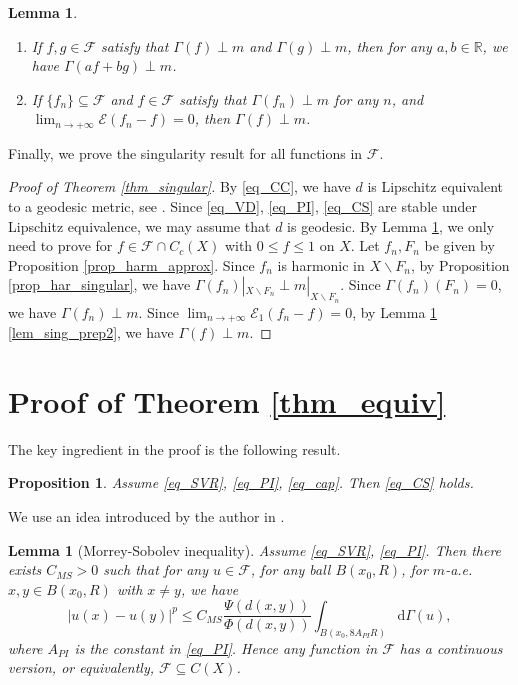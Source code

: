 \documentclass[11pt,a4paper]{article}
\numberwithin{equation}{section}
\theoremstyle{plain}
\newtheorem{proposition}[theorem]{Proposition}
\newtheorem{lemma}[theorem]{Lemma}
\theoremstyle{definition}
\begin{document}
\begin{lemma}\label{lem_sing_prep}
\hspace{0em}
\begin{enumerate}[label=(\arabic*),ref=(\arabic*)]
\item\label{lem_sing_prep1} If $f, g\in\mathcal{F}$ satisfy that $\Gamma(f)\perp m$ and $\Gamma(g)\perp m$, then for any $a,b\in\mathbb{R}$, we have $\Gamma(af+bg)\perp m$.
\item\label{lem_sing_prep2} If $\{f_n\}\subseteq\mathcal{F}$ and $f\in\mathcal{F}$ satisfy that $\Gamma(f_n)\perp m$ for any $n$, and $\lim_{n\to+\infty}\mathcal{E}(f_n-f)=0$, then $\Gamma(f)\perp m$.
\end{enumerate} 
\end{lemma}

Finally, we prove the singularity result for all functions in $\mathcal{F}$.

\begin{proof}[Proof of Theorem \ref{thm_singular}]
By \ref{eq_CC}, we have $d$ is Lipschitz equivalent to a geodesic metric, see \cite[PROPOSITION A.1]{KM20}. Since \ref{eq_VD}, \ref{eq_PI}, \ref{eq_CS} are stable under Lipschitz equivalence, we may assume that $d$ is geodesic. By Lemma \ref{lem_sing_prep}, we only need to prove for $f\in\mathcal{F}\cap C_c(X)$ with $0\le f\le1$ on $X$. Let $f_n, F_n$ be given by Proposition \ref{prop_harm_approx}. Since $f_n$ is harmonic in $X\backslash F_n$, by Proposition \ref{prop_har_singular}, we have $\Gamma(f_n)|_{X\backslash F_n}\perp m|_{X\backslash F_n}$. Since $\Gamma(f_n)(F_n)=0$, we have $\Gamma(f_n)\perp m$. Since $\lim_{n\to+\infty}\mathcal{E}_1(f_n-f)=0$, by Lemma \ref{lem_sing_prep} \ref{lem_sing_prep2}, we have $\Gamma(f)\perp m$.
\end{proof}

\section{Proof of Theorem \ref{thm_equiv}}\label{sec_equiv}

The key ingredient in the proof is the following result.

\begin{proposition}\label{prop_CS}
Assume \ref{eq_SVR}, \ref{eq_PI}, \ref{eq_cap}. Then \ref{eq_CS} holds.
\end{proposition}

We use an idea introduced by the author in \cite{Yan25b}.

\begin{lemma}[Morrey-Sobolev inequality]\label{lem_MS}
Assume \ref{eq_SVR}, \ref{eq_PI}. Then there exists $C_{MS}>0$ such that for any $u\in\mathcal{F}$, for any ball $B(x_0,R)$, for $m$-a.e. $x,y\in B(x_0,R)$ with $x\ne y$, we have
$$|u(x)-u(y)|^p\le C_{MS} \frac{\Psi(d(x,y))}{\Phi(d(x,y))}\int_{B(x_0,8A_{PI}R)}\mathrm{d}\Gamma(u),$$
where $A_{PI}$ is the constant in \ref{eq_PI}. Hence any function in $\mathcal{F}$ has a continuous version, or equivalently, $\mathcal{F}\subseteq C(X)$.
\end{lemma}
\end{document}
